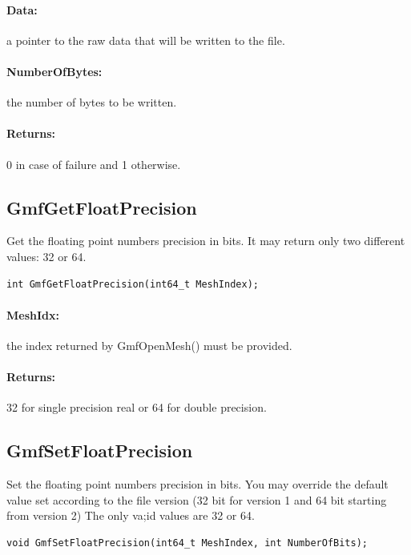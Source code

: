 \documentclass[a4paper,12pt]{article}
\begin{document}
\paragraph{Data:} a pointer to the raw data that will be written to the file.

\paragraph{NumberOfBytes:} the number of bytes to be written.

\paragraph{Returns:} 0 in case of failure and 1 otherwise.


\subsection{GmfGetFloatPrecision}
Get the floating point numbers precision in bits.
It may return only two different values: 32 or 64.

\begin{tt}
\begin{verbatim}
int GmfGetFloatPrecision(int64_t MeshIndex);
\end{verbatim}
\end{tt}
\normalfont

\paragraph{MeshIdx:}
the index returned by GmfOpenMesh() must be provided.

\paragraph{Returns:} 32 for single precision real or 64 for double precision.


\subsection{GmfSetFloatPrecision}
Set the floating point numbers precision in bits.
You may override the default value set according to the file version (32 bit for version 1 and 64 bit starting from version 2)
The only va;id values are 32 or 64.

\begin{tt}
\begin{verbatim}
void GmfSetFloatPrecision(int64_t MeshIndex, int NumberOfBits);
\end{verbatim}
\end{tt}
\normalfont
\end{document}
